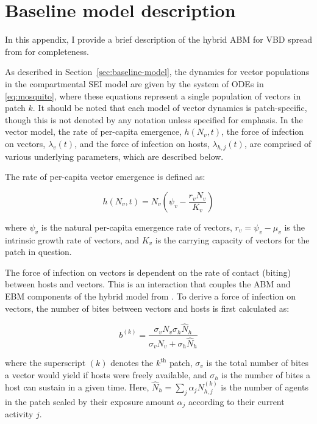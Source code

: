 \section{Baseline model description}\label{appendix:manore-abm}

In this appendix, I provide a brief description of the hybrid ABM for VBD spread from \citet{manore_network-patch_2015} for completeness. 


As described in Section~\ref{sec:baseline-model}, the dynamics for vector populations in the compartmental SEI model are given by the system of ODEs in \eqref{eq:mosquito}, where these equations represent a single population of vectors in patch $k$. It should be noted that each model of vector dynamics is patch-specific, though this is not denoted by any notation unless specified for emphasis. In the vector model, the rate of per-capita emergence, $h(N_v,t)$, the force of infection on vectors, $\lambda_v(t)$, and the force of infection on hosts, $\lambda_{h,j}(t)$, are comprised of various underlying parameters, which are described below.

The rate of per-capita vector emergence is defined as:

\begin{equation}
h(N_v,t)=N_v\left(\psi_v - \frac{r_v N_v}{K_v}\right)
\end{equation}

where $\psi_v$ is the natural per-capita emergence rate of vectors, $r_v=\psi_v-\mu_v$ is the intrinsic growth rate of vectors, and $K_v$ is the carrying capacity of vectors for the patch in question.

The force of infection on vectors is dependent on the rate of contact (biting) between hosts and vectors. This is an interaction that couples the ABM and EBM components of the hybrid model from \citet{manore_network-patch_2015}. To derive a force of infection on vectors, the number of bites between vectors and hosts is first calculated as:

\begin{equation}\label{eq:bites}
    b^{(k)}=\frac{\sigma_v N_v \sigma_h \hat{N}_h}{\sigma_v N_v + \sigma_h \hat{N}_h}
\end{equation}

where the superscript $(k)$ denotes the $k^{\text{th}}$ patch, $\sigma_v$ is the total number of bites a vector would yield if hosts were freely available, and $\sigma_h$ is the number of bites a host can sustain in a given time. Here, $\hat{N}_h=\sum_j{\alpha_j N^{(k)}_{h,j}}$ is the number of agents in the patch scaled by their exposure amount $\alpha_j$ according to their current activity $j$.

